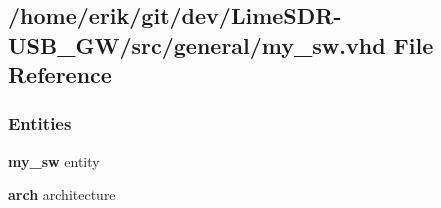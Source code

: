 \subsection{/home/erik/git/dev/\+Lime\+S\+D\+R-\/\+U\+S\+B\+\_\+\+G\+W/src/general/my\+\_\+sw.vhd File Reference}
\label{my__sw_8vhd}
\subsubsection*{Entities}
\begin{DoxyCompactItemize}
\item 
{\bf my\+\_\+sw} entity
\item 
{\bf arch} architecture
\end{DoxyCompactItemize}
